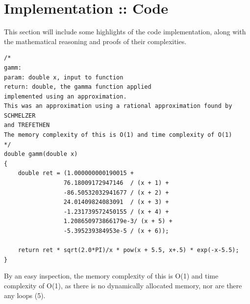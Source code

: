 \documentclass[12pt]{article}
\begin{document}
\section{Implementation :: Code}
This section will include some highlights of the code implementation, along with the mathematical reasoning and proofs of their complexities.
\lstset { 
    language=C++,
    basicstyle=\footnotesize,
}
\begin{lstlisting}
/*
gamm:
param: double x, input to function
return: double, the gamma function applied
implemented using an approximation.
This was an approximation using a rational approximation found by SCHMELZER
and TREFETHEN
The memory complexity of this is O(1) and time complexity of O(1)
*/
double gamm(double x) 
{
    double ret = (1.000000000190015 + 
                 76.18009172947146  / (x + 1) +  
                 -86.50532032941677 / (x + 2) + 
                 24.01409824083091  / (x + 3) +  
                 -1.231739572450155 / (x + 4) + 
                 1.208650973866179e-3/ (x + 5) + 
                 -5.395239384953e-5 / (x + 6));
    
    return ret * sqrt(2.0*PI)/x * pow(x + 5.5, x+.5) * exp(-x-5.5);
}
\end{lstlisting}
By an easy inspection, the memory complexity of this is O(1) and time complexity of O(1), as there is no dynamically allocated memory, nor are there any loops (5).
\end{document}
